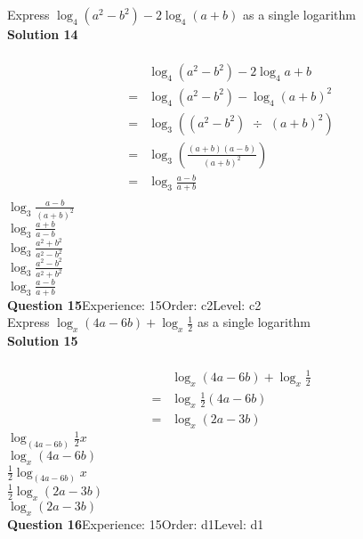 \documentclass{article}
\begin{document}
Express $\log_{4}(a^2-b^2)-2\log_{4}(a+b)$ as a single logarithm\\[4pt]
\noindent\textbf{Solution 14}\\[2pt]
\\[-10pt]\begin{align*}
&\log_{4}(a^2-b^2)-2\log_{4}a+b\\[2pt]
=&\log_{4}(a^2-b^2)-\log_{4}(a+b)^2\\[2pt]
=&\log_{3}((a^2-b^2) \,\, \div \,\, (a+b)^2)\\[2pt]
=&\log_{3}\left(\displaystyle\frac{(a+b)(a-b)}{(a+b)^2}\right)\\[2pt]
=&\log_{3}\displaystyle\frac{a-b}{a+b}\\[-130pt]
\end{align*}
$\log_{3}\displaystyle\frac{a-b}{(a+b)^2}$\\
$\log_{3}\displaystyle\frac{a+b}{a-b}$\\
$\log_{3}\displaystyle\frac{a^2+b^2}{a^2-b^2}$\\
$\log_{3}\displaystyle\frac{a^2-b^2}{a^2+b^2}$\\
$\log_{3}\displaystyle\frac{a-b}{a+b}$\\
\noindent\textbf{Question 15}\hspace{20pt}Experience: 15\hspace{20pt}Order: c2\hspace{20pt}Level: c2\\[2pt]
Express $\log_{x}(4a-6b)+\log_{x}\displaystyle\frac{1}{2}$ as a single logarithm\\[4pt]
\noindent\textbf{Solution 15}\\[2pt]
\\[-10pt]\begin{align*}
&\log_{x}(4a-6b)+\log_{x}\displaystyle\frac{1}{2}\\[2pt]
=&\log_{x}\displaystyle\frac{1}{2}(4a-6b)\\[2pt]
=&\log_{x}(2a-3b)
\end{align*}
$\log_{(4a-6b)}\displaystyle\frac{1}{2}x$\\
$\log_{x}(4a-6b)$\\
$\displaystyle\frac{1}{2}\log_{(4a-6b)}x$\\
$\displaystyle\frac{1}{2}\log_{x}(2a-3b)$\\
$\log_{x}(2a-3b)$\\
\noindent\textbf{Question 16}\hspace{20pt}Experience: 15\hspace{20pt}Order: d1\hspace{20pt}Level: d1\\[2pt]
\end{document}
